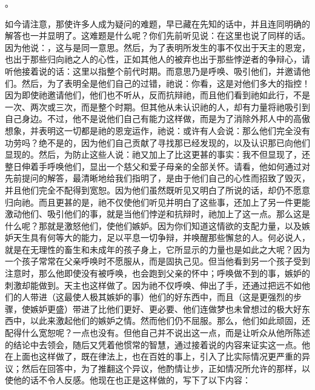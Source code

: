\newline{}。\newline{}\par

如今请注意，那使许多人成为疑问的难题，早已藏在先知的话中，并且连同明确的解答也一并显明了。这难题是什么呢？你们先前听见说：在这里也说了同样的话。因为他说：，这与是同一意思。然后，为了表明所发生的事不仅出于天主的恩宠，也出于那些归向祂之人的心性，正如其他人的被弃也出于那些悖逆者的争辩心，请听他接着说的话：这里以指整个前代时期。而意思乃是呼唤、吸引他们，并邀请他们。然后，为了表明全是他们自己的过错，祂说：你看，这是对他们多大的指控！因为即使祂邀请他们，他们也不听从，反而抗辩祂，而且他们看到祂如此行，不是一次、两次或三次，而是整个时期。但其他从未认识祂的人，却有力量将祂吸引到自己身边。不过，他不是说他们自己有能力这样做，而是为了消除外邦人中的高傲想象，并表明这一切都是祂的恩宠运作，祂说：或许有人会说：那么他们完全没有功劳吗？绝不是的，因为他们自己贡献了寻找那已经发现的，以及认识那已向他们显现的。然后，为防止这些人说：祂又加上了比这更甚的事实：我不但显现了，还整日伸着手呼唤他们，显出一个慈父和爱子母亲的全部关怀。请看，他如何通过对先前提问的解答，最清晰地给我们指明了，是由于他们自己的心性而招致了毁灭，并且他们完全不配得到宽恕。因为他们虽然既听见又明白了所说的话，却仍不愿意归向祂。而且更甚的是，祂不仅使他们听见并明白了这些事，还加上了另一件更能激动他们、吸引他们的事，就是当他们悖逆和抗辩时，祂加上了这一点。那么这是什么呢？那就是激怒他们，使他们嫉妒。因为你们知道这情欲的支配力量，以及嫉妒天生具有何等大的能力，足以平息一切争辩，并唤醒那些懈怠的人。何必说人，就是在无理性的畜生和未成年的孩子身上，它所显示的力量也是如此之大呢？因为一个孩子常常在父亲呼唤时不愿服从，而是固执己见。但当他看到另一个孩子受到注意时，那么他即使没有被呼唤，也会跑到父亲的怀中；呼唤做不到的事，嫉妒的刺激却能做到。天主也这样做了。因为祂不仅呼唤、伸出了手，还通过把远不如他们的人带进（这最使人极其嫉妒的事）他们的好东西中，而且（这是更强烈的步骤，使嫉妒更盛）带进了比他们更好、更必要、他们连做梦也未曾想过的极大好东西中，以此来激起他们的嫉妒之情。然而他们仍不屈服。那么，他们如此顽固，还配得什么宽恕呢？一点也没有。但他自己并不说出这一点，而是让听众从他所陈述的结论中去领会，随后又凭着他惯常的智慧，通过接着说的内容来证实这一点。他在上面也这样做了，既在律法上，也在百姓的事上，引入了比实际情况更严重的异议；然后在回答中，为了推翻这个异议，他酌情让步，正如情况所允许的那样，以使他的话不令人反感。他现在也正是这样做的，写下了以下内容：\par

